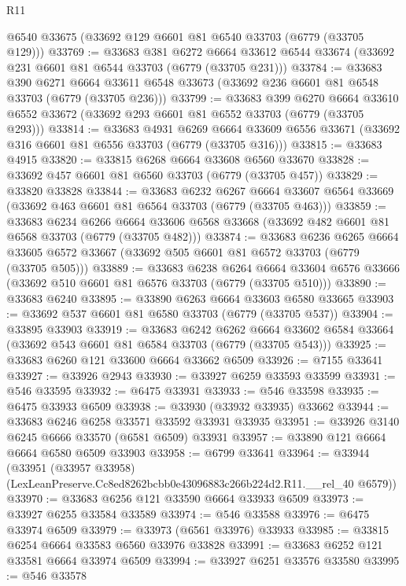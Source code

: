 \begin{lexlean}{R11}
\begin{coremodule}
    @6540
    @33675
    (@33692 @129 @6601 @81 @6540 @33703 (@6779 (@33705 @129)))
@33769 := @33683
    @381
    @6272
    @6664
    @33612
    @6544
    @33674
    (@33692 @231 @6601 @81 @6544 @33703 (@6779 (@33705 @231)))
@33784 := @33683
    @390
    @6271
    @6664
    @33611
    @6548
    @33673
    (@33692 @236 @6601 @81 @6548 @33703 (@6779 (@33705 @236)))
@33799 := @33683
    @399
    @6270
    @6664
    @33610
    @6552
    @33672
    (@33692 @293 @6601 @81 @6552 @33703 (@6779 (@33705 @293)))
@33814 := @33683
    @4931
    @6269
    @6664
    @33609
    @6556
    @33671
    (@33692 @316 @6601 @81 @6556 @33703 (@6779 (@33705 @316)))
@33815 := @33683 @4915
@33820 := @33815 @6268 @6664 @33608 @6560 @33670
@33828 := @33692 @457 @6601 @81 @6560 @33703 (@6779 (@33705 @457))
@33829 := @33820 @33828
@33844 := @33683
    @6232
    @6267
    @6664
    @33607
    @6564
    @33669
    (@33692 @463 @6601 @81 @6564 @33703 (@6779 (@33705 @463)))
@33859 := @33683
    @6234
    @6266
    @6664
    @33606
    @6568
    @33668
    (@33692 @482 @6601 @81 @6568 @33703 (@6779 (@33705 @482)))
@33874 := @33683
    @6236
    @6265
    @6664
    @33605
    @6572
    @33667
    (@33692 @505 @6601 @81 @6572 @33703 (@6779 (@33705 @505)))
@33889 := @33683
    @6238
    @6264
    @6664
    @33604
    @6576
    @33666
    (@33692 @510 @6601 @81 @6576 @33703 (@6779 (@33705 @510)))
@33890 := @33683 @6240
@33895 := @33890 @6263 @6664 @33603 @6580 @33665
@33903 := @33692 @537 @6601 @81 @6580 @33703 (@6779 (@33705 @537))
@33904 := @33895 @33903
@33919 := @33683
    @6242
    @6262
    @6664
    @33602
    @6584
    @33664
    (@33692 @543 @6601 @81 @6584 @33703 (@6779 (@33705 @543)))
@33925 := @33683 @6260 @121 @33600 @6664 @33662 @6509
@33926 := @7155 @33641
@33927 := @33926 @2943
@33930 := @33927 @6259 @33593 @33599
@33931 := @546 @33595
@33932 := @6475 @33931
@33933 := @546 @33598
@33935 := @6475 @33933 @6509
@33938 := @33930 (@33932 @33935) @33662
@33944 := @33683 @6246 @6258 @33571 @33592 @33931 @33935
@33951 := @33926 @3140 @6245 @6666 @33570 (@6581 @6509) @33931
@33957 := @33890 @121 @6664 @6664 @6580 @6509 @33903
@33958 := @6799 @33641
@33964 := @33944
    (@33951 (@33957 @33958) (LexLeanPreserve.Cc8ed8262bcbb0e43096883c266b224d2.R11.__rel_40 @6579))
@33970 := @33683 @6256 @121 @33590 @6664 @33933 @6509
@33973 := @33927 @6255 @33584 @33589
@33974 := @546 @33588
@33976 := @6475 @33974 @6509
@33979 := @33973 (@6561 @33976) @33933
@33985 := @33815 @6254 @6664 @33583 @6560 @33976 @33828
@33991 := @33683 @6252 @121 @33581 @6664 @33974 @6509
@33994 := @33927 @6251 @33576 @33580
@33995 := @546 @33578

\end{coremodule}
\end{lexlean}
